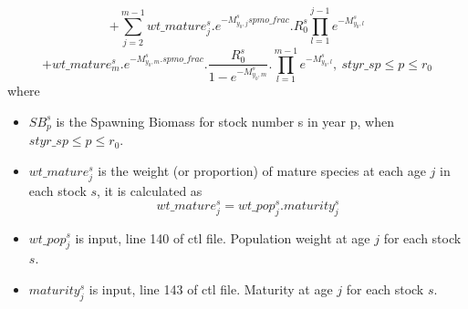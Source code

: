 \documentclass{article}
\begin{document}
\begin{equation*}
    +\sum_{j=2}^{m-1}wt\_mature^s_j.e^{-M^s_{y_0,j} spmo\_frac}.R^s_0\prod_{l=1}^{j-1}e^{-M^s_{y_0,l}} 
\end{equation*}
\begin{equation*}
    + wt\_mature^s_{m}.e^{-M^s_{y_0,m}.spmo\_frac}.\dfrac{R^s_0}{1-e^{-M^s_{y_0,m}}}.\prod_{l=1}^{m-1}e^{-M^s_{y_0,l}}, \ styr\_sp\leq p \leq r_0
\end{equation*}
where 
\begin{itemize}
   \item $SB^s_p$ is the Spawning Biomass for stock number s in year p, when  $styr\_sp\leq p \leq r_0$. 
   \item $wt\_mature^s_j$ is the weight (or proportion) of mature species at each age $j$ in each stock $s$, it is calculated as
    \begin{equation}
        wt\_mature^s_j=wt\_pop^s_j.maturity^s_j
    \end{equation}
    \item $wt\_pop^s_j$ is input, line 140 of ctl file. Population weight at age $j$ for each stock $s$.
    \item $maturity^s_j$ is input, line 143 of ctl file. Maturity at age $j$ for each stock $s$.
\end{itemize}
\end{document}
